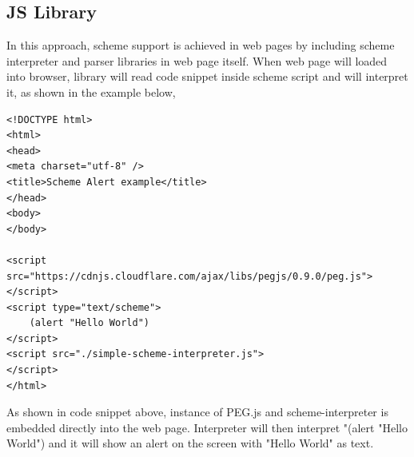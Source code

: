 \subsection{JS Library}


In this approach, scheme support is achieved in web pages by including scheme interpreter and parser libraries in web page itself. When web page will loaded into browser,  library will read code snippet inside scheme script and will interpret it, as shown in the example below, 


\begin{lstlisting}[frame=single]  
<!DOCTYPE html>
<html>
<head>
<meta charset="utf-8" />
<title>Scheme Alert example</title>
</head>
<body>
</body>

<script src="https://cdnjs.cloudflare.com/ajax/libs/pegjs/0.9.0/peg.js">
</script>
<script type="text/scheme">
	(alert "Hello World")
</script>
<script src="./simple-scheme-interpreter.js">
</script>
</html>
\end{lstlisting}

As shown in code snippet above,  instance of PEG.js and scheme-interpreter is embedded directly into the web page. Interpreter will then interpret "(alert "Hello World") and it will show an alert on the screen with "Hello World" as text.






